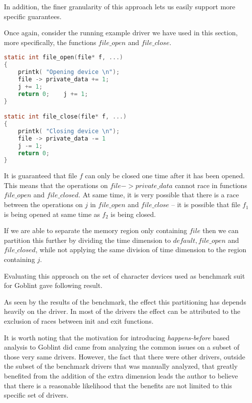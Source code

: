 \documentclass[..thesis.tex]{subfiles}
\begin{document}


In addition, the finer granularity of this approach lets us easily support more specific guarantees.

Once again, consider the running example driver we have used in this section, more specifically, the functions $file\_open$ and $file\_close$.

\begin{lstlisting}[language=c,style=def]
static int file_open(file* f, ...)
{
    printk( "Opening device \n");
    file -> private_data += 1;
    j += 1;
    return 0;    j += 1;
}

static int file_close(file* f, ...)
{
    printk( "Closing device \n");
    file -> private_data -= 1
    j -= 1;
    return 0;
}
\end{lstlisting}

It is guaranteed that file $f$ can only be closed one time after it has been opened. This means that the operations on $file -> private\_data$ cannot race in functions $file\_open$ and $file\_closed$. At same time, it is very possible that there is a race between the operations on $j$ in $file\_open$ and $file\_close$ -- it is possible that file $f_1$ is being opened at same time as $f_2$ is being closed. 

If we are able to separate the memory region only containing $file$ then we can partition this further by dividing the time dimension to $default, file\_open$ and $file\_closed$, while not applying the same division of time dimension to the region containing $j$. 


Evaluating this approach on the set of character devices used as benchmark suit for Goblint gave following result.


As seen by the results of the benchmark, the effect this partitioning has depends heavily on the driver. In most of the drivers the effect can be attributed to the exclusion of races between init and exit functions. 


It is worth noting that the motivation for introducing \textit{happens-before} based analysis to Goblint did came from analyzing the common issues on a subset of those very same drivers. However, the fact that there were other drivers, outside the subset of the benchmark drivers that was manually analyzed, that greatly benefited from the addition of the extra dimension leads the author to believe that there is a reasonable likelihood that the benefits are not limited to this specific set of drivers.
\end{document}
